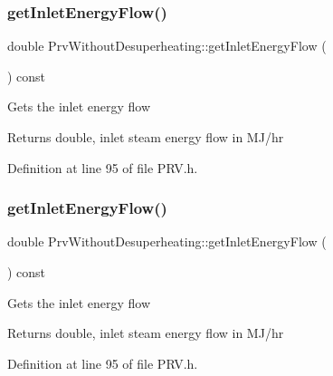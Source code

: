 \subsubsection{\texorpdfstring{get\+Inlet\+Energy\+Flow()}{getInletEnergyFlow()}\hspace{0.1cm}{\footnotesize\ttfamily [1/3]}}
{\footnotesize\ttfamily double Prv\+Without\+Desuperheating\+::get\+Inlet\+Energy\+Flow (\begin{DoxyParamCaption}{ }\end{DoxyParamCaption}) const\hspace{0.3cm}{\ttfamily [inline]}}

Gets the inlet energy flow \begin{DoxyReturn}{Returns}
double, inlet steam energy flow in M\+J/hr 
\end{DoxyReturn}


Definition at line 95 of file P\+R\+V.\+h.

\mbox{\label{class_prv_without_desuperheating_a040dbe6a11a722f15450cd00ac454c48}} 
\subsubsection{\texorpdfstring{get\+Inlet\+Energy\+Flow()}{getInletEnergyFlow()}\hspace{0.1cm}{\footnotesize\ttfamily [2/3]}}
{\footnotesize\ttfamily double Prv\+Without\+Desuperheating\+::get\+Inlet\+Energy\+Flow (\begin{DoxyParamCaption}{ }\end{DoxyParamCaption}) const\hspace{0.3cm}{\ttfamily [inline]}}

Gets the inlet energy flow \begin{DoxyReturn}{Returns}
double, inlet steam energy flow in M\+J/hr 
\end{DoxyReturn}


Definition at line 95 of file P\+R\+V.\+h.

\mbox{\label{class_prv_without_desuperheating_a040dbe6a11a722f15450cd00ac454c48}} 
